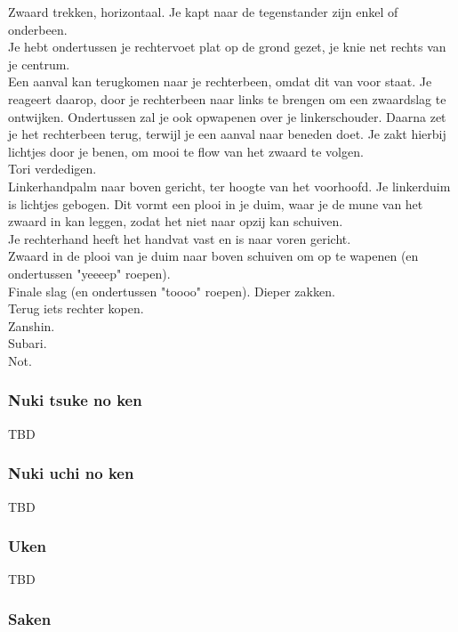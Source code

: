 \suwaristart
Zwaard trekken, horizontaal. Je kapt naar de tegenstander zijn enkel of onderbeen.\\
Je hebt ondertussen je rechtervoet plat op de grond gezet, je knie net rechts van je centrum.\\
Een aanval kan terugkomen naar je rechterbeen, omdat dit van voor staat. Je reageert daarop, door je rechterbeen naar links te brengen om een zwaardslag te ontwijken. Ondertussen zal je ook opwapenen over je linkerschouder. Daarna zet je het rechterbeen terug, terwijl je een aanval naar beneden doet. Je zakt hierbij lichtjes door je benen, om mooi te flow van het zwaard te volgen.\\
Tori verdedigen.\\
Linkerhandpalm naar boven gericht, ter hoogte van het voorhoofd. Je linkerduim is lichtjes gebogen. Dit vormt een plooi in je duim, waar je de mune van het zwaard in kan leggen, zodat het niet naar opzij kan schuiven.\\
Je rechterhand heeft het handvat vast en is naar voren gericht.\\
Zwaard in de plooi van je duim naar boven schuiven om op te wapenen (en ondertussen "yeeeep" roepen).\\
Finale slag (en ondertussen "toooo" roepen). Dieper zakken.\\
Terug iets rechter kopen.\\
Zanshin.\\
Subari.\\
Not.

\subsubsection{Nuki tsuke no ken}

\suwaristart
TBD


\subsubsection{Nuki uchi no ken}

\suwaristart
TBD

\subsubsection{Uken}

\suwaristart
TBD

\subsubsection{Saken}

